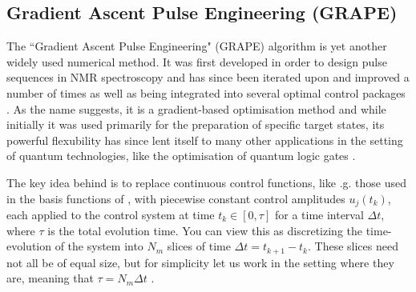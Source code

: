 \subsection{Gradient Ascent Pulse Engineering (GRAPE)}\label{sec:3.3.2_GRAPE}

The ``Gradient Ascent Pulse Engineering" (GRAPE) algorithm is yet another widely used  numerical method. It was first developed in order to design pulse sequences in NMR spectroscopy \cite{khaneja_optimal_2005} and has since been iterated upon and improved a number of times as well as being integrated into several optimal control packages \cite{de_fouquieres_second_2011, chen_iterative_2022, machnes_comparing_2011, johansson_qutip_2013}. As the name suggests, it is a gradient-based optimisation method and while initially it was used primarily for the preparation of specific target states, its powerful flexubility has since lent itself to many other applications in the setting of quantum technologies, like the optimisation of quantum logic gates \cite{motzoi_optimal_2011, anderson_accurate_2015}.

The key idea behind  is to replace continuous control functions, like \@e.g. those used in the basis functions of , with piecewise constant control amplitudes $u_j(t_k)$, each applied to the control system at time $t_k \in [0, \tau]$ for a time interval $\Delta t$, where $\tau$ is the total evolution time. You can view this as discretizing the time-evolution of the system into $N_m$ slices of time $\Delta t = t_{k + 1} - t_k$. These slices need not all be of equal size, but for simplicity let us work in the setting where they are, meaning that $\tau = N_m \Delta t$ . 

